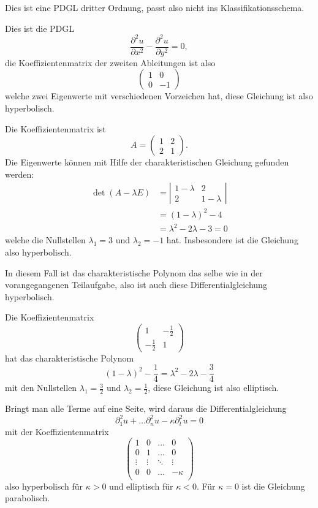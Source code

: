 \begin{loesung}
\begin{teilaufgaben}
\item Dies ist eine PDGL dritter Ordnung, passt also nicht ins
Klassifikationsschema.
\item Dies ist die PDGL
\[
\frac{\partial^2u}{\partial x^2}-\frac{\partial^2 u}{\partial y^2}=0,
\]
die Koeffizientenmatrix der zweiten Ableitungen ist also
\[
\begin{pmatrix}
1&0\\0&-1
\end{pmatrix}
\]
welche zwei Eigenwerte mit verschiedenen Vorzeichen hat, diese Gleichung
ist also hyperbolisch.
\item Die Koeffizientenmatrix ist
\[
A=\begin{pmatrix}
1&2\\2&1
\end{pmatrix}.
\]
Die Eigenwerte können mit Hilfe der charakteristischen Gleichung
gefunden werden:
\begin{align*}
\det(A-\lambda E)
&=
\left|\begin{matrix} 1-\lambda&2\\2&1-\lambda\end{matrix}\right|
\\
&=(1-\lambda)^2-4\\
&=\lambda^2-2\lambda-3=0
\end{align*}
welche die Nullstellen $\lambda_1=3$ und $\lambda_2=-1$ hat.
Insbesondere ist die Gleichung also hyperbolisch.
\item
In diesem Fall ist das charakteristische Polynom das selbe wie in
der vorangegangenen Teilaufgabe, also ist auch diese Differentialgleichung
hyperbolisch.
\item Die Koeffizientenmatrix
\[
\begin{pmatrix}
1&-\frac12\\
-\frac12&1
\end{pmatrix}
\]
hat das charakteristische Polynom
\[
(1-\lambda)^2-\frac14=\lambda^2-2\lambda-\frac34
\]
mit den Nullstellen $\lambda_1=\frac32$ und $\lambda_2=\frac12$,
diese Gleichung ist also elliptisch.
\item
Bringt man alle Terme auf eine Seite, wird daraus die Differentialgleichung
\[
\partial_1^2u+\dots\partial_n^2u-\kappa\partial_t^2u=0
\]
mit der Koeffizientenmatrix
\[
\begin{pmatrix}
1&0&\dots&0\\
0&1&\dots&0\\
\vdots&\vdots&\ddots&\vdots\\
0&0&\dots&-\kappa\\
\end{pmatrix}
\]
also hyperbolisch für $\kappa > 0$ und elliptisch für $\kappa < 0$.
Für $\kappa=0$ ist die Gleichung parabolisch.
\end{teilaufgaben}
\end{loesung}
